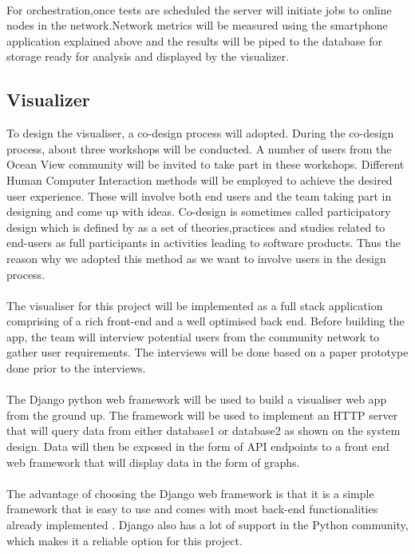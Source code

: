 \paragraph{}
For orchestration,once tests are scheduled the server will initiate jobs to online nodes in the network.Network metrics will be measured using the smartphone application explained above and the results will be piped to the database for storage ready for analysis and displayed by the visualizer.    

\subsection{Visualizer}
To design the visualiser, a co-design process will adopted. During the co-design process, about three workshops  will be conducted. A number of users from the Ocean View community will be invited to take part in these workshops. Different Human Computer Interaction methods will be employed to achieve the desired user experience. These will involve both end users and the team taking part in designing and come up with ideas. Co-design is sometimes called participatory design which is defined by \cite{ctx2100202260004041} as a set of theories,practices and studies related to end-users as full participants in activities leading to software products. Thus the reason why we adopted this method as we want to involve users in the design process.
\paragraph{}
The visualiser for this project will be implemented as a full stack application comprising of a rich front-end and a well optimised back end. Before building the app, the team will interview potential users from the community network to gather user requirements. The interviews will be done based on a paper prototype done prior to the interviews.
\paragraph{}
The  Django python web framework will be used to build a visualiser web app from the ground up. The framework will be used to implement an HTTP server that will query data from either database1 or database2 as shown on the system design. Data will then be exposed in the form of API endpoints to a front end web framework that will display data in the form of graphs.
\paragraph{}
The advantage of choosing the Django web framework is that it is a simple framework that is easy to use and comes with most back-end functionalities already implemented \cite{10.1007/978-3-540-87403-4_11}. Django also has a lot of support in the Python community, which makes it a reliable option for this project.
